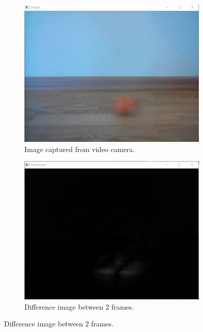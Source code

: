 \documentclass[a4paper,12pt]{report}
\begin{document}
\vspace{0.5cm}
\begin{figure}[h!]
  \centering
  \begin{subfigure}[b]{0.4\linewidth}
    \includegraphics[width=\linewidth]{fig/img1.png}
    \caption{Image captured from video camera.}
  \end{subfigure}
\hspace{0.5cm}
  \begin{subfigure}[b]{0.4\linewidth}
    \includegraphics[width=\linewidth]{fig/img2.png}
    \caption{Difference image between 2 frames.}
  \end{subfigure}

\end{figure}
\end{document}
